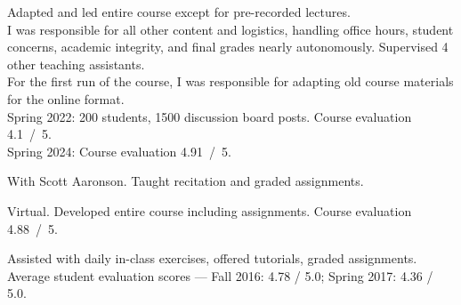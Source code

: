 \documentclass[11pt,letterpaper,serif]{moderncv}
\begin{document}
{
	\begin{adjustwidth}{.25in}{}
		Adapted and led entire course except for pre-recorded lectures.\\
		I was responsible for all other content and logistics, handling office hours, student concerns, academic integrity, and final grades nearly autonomously.
		Supervised 4 other teaching assistants.\\
		For the first run of the course,
		I was responsible for adapting old course materials for the online format.\\
		Spring 2022: 200 students, 1500 discussion board posts. Course evaluation 4.1~/~5.
		\\ Spring 2024: Course evaluation 4.91~/~5.
	\end{adjustwidth}
}

\smallskip

{
	\begin{adjustwidth}{.25in}{}
	With Scott Aaronson. Taught recitation and graded assignments.
	\end{adjustwidth}
}

\smallskip

{
	\begin{adjustwidth}{.25in}{}
		Virtual.
		Developed entire course including assignments.
		Course evaluation 4.88~/~5.
	\end{adjustwidth}
}

\smallskip

{
	\begin{adjustwidth}{.25in}{}
		Assisted with daily in-class exercises, offered tutorials, graded assignments. \newline
		Average student evaluation scores --- Fall 2016: 4.78 / 5.0; Spring 2017: 4.36 / 5.0.
	\end{adjustwidth}
}

\smallskip

\end{document}
